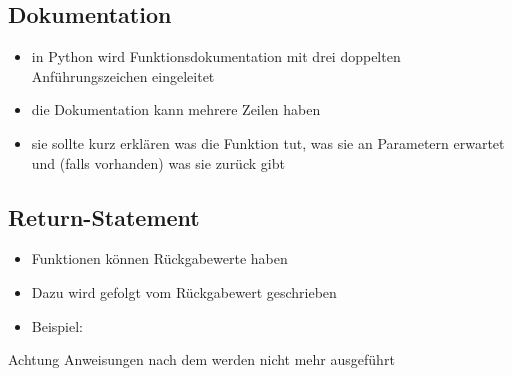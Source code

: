 \subsection{Dokumentation}
\begin{frame}
	\slidehead
	\begin{itemize}
		\item in Python wird Funktionsdokumentation mit drei doppelten Anführungszeichen eingeleitet
		\item die Dokumentation kann mehrere Zeilen haben
		\item sie sollte kurz erklären was die Funktion tut, was sie an Parametern erwartet und (falls vorhanden) was sie zurück gibt
	\end{itemize}
\end{frame}

\subsection{Return-Statement}
\begin{frame}
	\slidehead
	\begin{itemize}
		\item Funktionen können Rückgabewerte haben
		\item Dazu wird  gefolgt vom Rückgabewert geschrieben
		\item Beispiel: 
	\end{itemize}
\end{frame}

\begin{frame}
	\slidehead

	\begin{block}{Achtung}
		Anweisungen nach dem  werden nicht mehr ausgeführt
	\end{block}
\end{frame}



